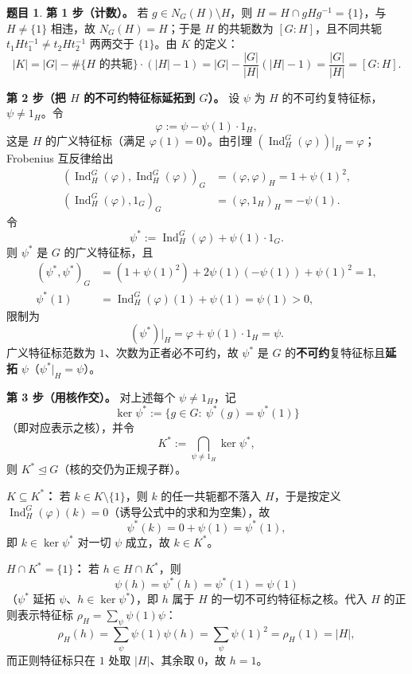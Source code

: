 \documentclass[a4paper]{ctexart}
\theoremstyle{definition}
\newtheorem{example}{题目}[section]
\theoremstyle{analysis}
\theoremstyle{plain}
\begin{document}
\begin{example}
\textbf{第 1 步（计数）。} 若 \(g\in N_G(H)\setminus H\)，则 \(H=H\cap gHg^{-1}=\{1\}\)，与 \(H\neq\{1\}\) 相违，故 \(N_G(H)=H\)；于是 \(H\) 的共轭数为 \([G:H]\)，且不同共轭 \(t_1Ht_1^{-1}\neq t_2Ht_2^{-1}\) 两两交于 \(\{1\}\)。由 \(K\) 的定义：
\[
  |K|=|G|-\#\{H\text{ 的共轭}\}\cdot(|H|-1)
  =|G|-\frac{|G|}{|H|}(|H|-1)=\frac{|G|}{|H|}=[G:H].
\]

\textbf{第 2 步（把 \(H\) 的不可约特征标延拓到 \(G\)）。} 设 \(\psi\) 为 \(H\) 的不可约复特征标，\(\psi\neq 1_H\)。令
\[
  \varphi:=\psi-\psi(1)\cdot 1_H,
\]
这是 \(H\) 的广义特征标（满足 \(\varphi(1)=0\)）。由引理 \((\operatorname{Ind}_H^G(\varphi))|_H=\varphi\)；Frobenius 互反律给出
\[
  \begin{aligned}
  (\operatorname{Ind}_H^G(\varphi),\operatorname{Ind}_H^G(\varphi))_G
  &=(\varphi,\varphi)_H=1+\psi(1)^2,\\
  (\operatorname{Ind}_H^G(\varphi),1_G)_G
  &=(\varphi,1_H)_H=-\psi(1).
  \end{aligned}
\]
令
\[
  \psi^*:=\operatorname{Ind}_H^G(\varphi)+\psi(1)\cdot 1_G.
\]
则 \(\psi^*\) 是 \(G\) 的广义特征标，且
\[
  \begin{aligned}
  (\psi^*,\psi^*)_G
  &=(1+\psi(1)^2)+2\psi(1)(-\psi(1))+\psi(1)^2=1,\\
  \psi^*(1)
  &=\operatorname{Ind}_H^G(\varphi)(1)+\psi(1)=\psi(1)>0,
  \end{aligned}
\]
限制为
\[
  (\psi^*)\big|_H=\varphi+\psi(1)\cdot 1_H=\psi.
\]
广义特征标范数为 \(1\)、次数为正者必不可约，故 \(\psi^*\) 是 \(G\) 的\textbf{不可约}复特征标且\textbf{延拓} \(\psi\)（\(\psi^*|_H=\psi\)）。

\textbf{第 3 步（用核作交）。} 对上述每个 \(\psi\neq 1_H\)，记
\[
  \ker\psi^*:=\{g\in G:\ \psi^*(g)=\psi^*(1)\}
\]
（即对应表示之核），并令
\[
  K^*:=\bigcap_{\psi\neq 1_H}\ker\psi^*,
\]
则 \(K^*\trianglelefteq G\)（核的交仍为正规子群）。

\textbf{\(K\subseteq K^*\)：} 若 \(k\in K\setminus\{1\}\)，则 \(k\) 的任一共轭都不落入 \(H\)，于是按定义 \(\operatorname{Ind}_H^G(\varphi)(k)=0\)（诱导公式中的求和为空集），故
\[
  \psi^*(k)=0+\psi(1)=\psi^*(1),
\]
即 \(k\in\ker\psi^*\) 对一切 \(\psi\) 成立，故 \(k\in K^*\)。

\textbf{\(H\cap K^*=\{1\}\)：} 若 \(h\in H\cap K^*\)，则
\[
  \psi(h)=\psi^*(h)=\psi^*(1)=\psi(1)
\]
（\(\psi^*\) 延拓 \(\psi\)、\(h\in\ker\psi^*\)），即 \(h\) 属于 \(H\) 的一切不可约特征标之核。代入 \(H\) 的正则表示特征标 \(\rho_H=\sum_\psi\psi(1)\psi\)：
\[
  \rho_H(h)=\sum_\psi\psi(1)\psi(h)=\sum_\psi\psi(1)^2=\rho_H(1)=|H|,
\]
而正则特征标只在 \(1\) 处取 \(|H|\)、其余取 \(0\)，故 \(h=1\)。


\end{example}
\end{document}

